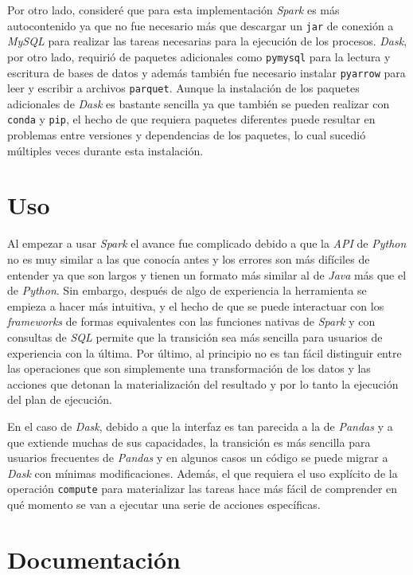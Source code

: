 Por otro lado, consideré que para esta implementación \textit{Spark} es más autocontenido ya que no fue necesario más que descargar un \texttt{jar} de conexión a \textit{MySQL} para realizar las tareas necesarias para la ejecución de los procesos. \textit{Dask}, por otro lado, requirió de paquetes adicionales como \texttt{pymysql} para la lectura y escritura de bases de datos y además también fue necesario instalar \texttt{pyarrow} para leer y escribir a archivos \texttt{parquet}. Aunque la instalación de los paquetes adicionales de \textit{Dask} es bastante sencilla ya que también se pueden realizar con \texttt{conda} y \texttt{pip}, el hecho de que requiera paquetes diferentes puede resultar en problemas entre versiones y dependencias de los paquetes, lo cual sucedió múltiples veces durante esta instalación. 

\section{Uso}

Al empezar a usar \textit{Spark} el avance fue complicado debido a que la \textit{API} de \textit{Python} no es muy similar a las que conocía antes y los errores son más difíciles de entender ya que son largos y tienen un formato más similar al de \textit{Java} más que el de \textit{Python}. Sin embargo, después de algo de experiencia la herramienta se empieza a hacer más intuitiva, y el hecho de que se puede interactuar con los \textit{frameworks} de formas equivalentes con las funciones nativas de \textit{Spark} y con consultas de \textit{SQL} permite que la transición sea más sencilla para usuarios de experiencia con la última. Por último, al principio no es tan fácil distinguir entre las operaciones que son simplemente una transformación de los datos y las acciones que detonan la materialización del resultado y por lo tanto la ejecución del plan de ejecución.

En el caso de \textit{Dask}, debido a que la interfaz es tan parecida a la de \textit{Pandas} y a que extiende muchas de sus capacidades, la transición es más sencilla para usuarios frecuentes de \textit{Pandas} y en algunos casos un código se puede migrar a \textit{Dask} con mínimas modificaciones. Además, el que requiera el uso explícito de la operación \texttt{compute} para materializar las tareas hace más fácil de comprender en qué momento se van a ejecutar una serie de acciones específicas. 

\section{Documentación}

